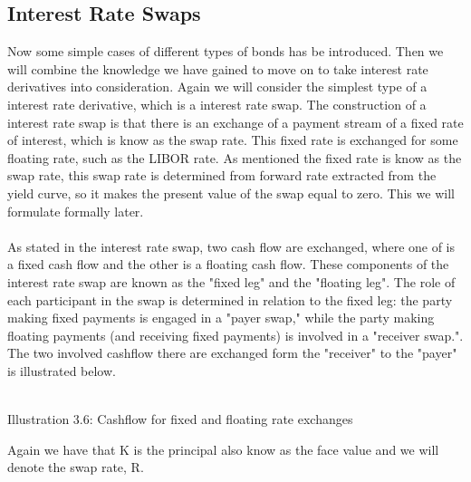 \subsection{Interest Rate Swaps}
Now some simple cases of different types of bonds has be introduced. Then we will combine the knowledge we have gained to move on
to take interest rate derivatives into consideration. Again we will consider the simplest type of a interest rate derivative, which is a
interest rate swap. The construction of a interest rate swap is that there is an  exchange of a payment stream of a fixed rate of interest,
which is know as the swap rate. This fixed rate is exchanged for some floating rate, such as the LIBOR rate. 
As mentioned the fixed rate is know as the swap rate, this swap rate is determined from forward rate extracted from the yield curve, 
so it makes the present value of the swap equal to zero. This we will formulate formally later. 
\\\\
As stated in the interest rate swap, two cash flow are exchanged, where one of is a 
fixed cash flow and the other is a floating cash flow. These components of
the interest rate swap are known as the "fixed leg" and the "floating leg". 
The role of each participant in the swap is determined in relation to the 
fixed leg: the party making fixed payments is engaged in a "payer swap," 
while the party making floating payments (and receiving fixed payments) is
involved in a "receiver swap.". The two involved cashflow there are exchanged form the "receiver" to the "payer" is illustrated below.
\\
\begin{center}
    \\[10pt] 
    Illustration 3.6: Cashflow for fixed and floating rate exchanges
\end{center} 
\noindent
Again we have that K is the principal also know as the face value and we will denote the swap rate, R.
